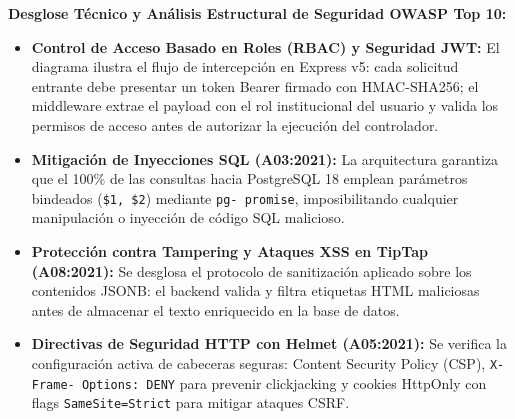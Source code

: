 \documentclass[12pt,a4paper]{article}
\begin{document}
\noindent
\noindent
\textbf{Desglose Técnico y Análisis Estructural de Seguridad OWASP Top 10:}
\begin{itemize}[leftmargin=1.5em, itemsep=3pt]
    \item \textbf{Control de Acceso Basado en Roles (RBAC) y Seguridad JWT:} El diagrama ilustra el flujo de intercepción en Express v5: cada solicitud entrante debe presentar un token Bearer firmado con HMAC-SHA256; el middleware extrae el payload con el rol institucional del usuario y valida los permisos de acceso antes de autorizar la ejecución del controlador.
    \item \textbf{Mitigación de Inyecciones SQL (A03:2021):} La arquitectura garantiza que el 100\% de las consultas hacia PostgreSQL 18 emplean parámetros bindeados (\texttt{\$1, \$2}) mediante \texttt{pg- promise}, imposibilitando cualquier manipulación o inyección de código SQL malicioso.
    \item \textbf{Protección contra Tampering y Ataques XSS en TipTap (A08:2021):} Se desglosa el protocolo de sanitización aplicado sobre los contenidos JSONB: el backend valida y filtra etiquetas HTML maliciosas antes de almacenar el texto enriquecido en la base de datos.
    \item \textbf{Directivas de Seguridad HTTP con Helmet (A05:2021):} Se verifica la configuración activa de cabeceras seguras: Content Security Policy (CSP), \texttt{X- Frame- Options: DENY} para prevenir clickjacking y cookies HttpOnly con flags \texttt{SameSite=Strict} para mitigar ataques CSRF.
\end{itemize}
\end{document}
